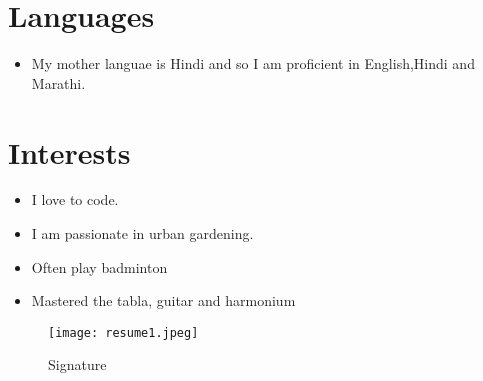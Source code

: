 \documentclass[a4paper,10pt]{article}
\begin{document}
\section*{Languages}
\begin{itemize}
    \item My mother languae is Hindi and so I am proficient in English,Hindi and Marathi.
\end{itemize}

\section*{Interests}
\begin{itemize}
	\item I love to code.
	\item	I am passionate in urban gardening.
	\item Often play badminton
	\item Mastered the tabla, guitar and harmonium

\end{itemize}

\begin{figure}[h]
\centering
\texttt{[image: resume1.jpeg]}
\caption{Signature}
\label{fig:example}
\end{figure}
\end{document}
